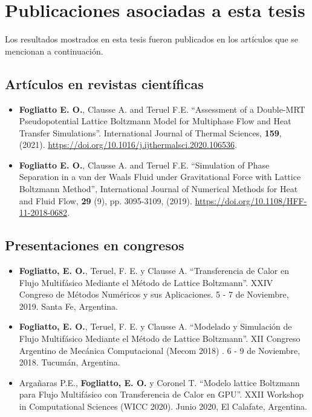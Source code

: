\chapter{Publicaciones asociadas a esta tesis}

Los resultados mostrados en esta tesis fueron publicados en los art\'iculos que se mencionan a continuaci\'on.

\section*{Art\'iculos en revistas cient\'ificas}

\begin{itemize}
\item \textbf{Fogliatto E. O.}, Clausse A. and Teruel F.E. ``Assessment of a Double-MRT Pseudopotential Lattice Boltzmann Model for Multiphase Flow and Heat Transfer Simulations''. International Journal of Thermal Sciences, \textbf{159}, (2021). \url{https://doi.org/10.1016/j.ijthermalsci.2020.106536}.
  
\item \textbf{Fogliatto E. O.}, Clausse A. and Teruel F.E. ``Simulation of Phase Separation in a van der Waals Fluid under Gravitational Force with Lattice Boltzmann Method'', International Journal of Numerical Methods for Heat and Fluid Flow, \textbf{29} (9), pp. 3095-3109, (2019). \url{https://doi.org/10.1108/HFF-11-2018-0682}.
\end{itemize}


\section*{Presentaciones en congresos}

\begin{itemize}
\item \textbf{Fogliatto, E. O.}, Teruel, F. E. y Clausse A. ``Transferencia de Calor en Flujo Multif\'asico Mediante el M\'etodo de Lattice Boltzmann''. XXIV Congreso de M\'etodos Num\'ericos y sus Aplicaciones. 5 - 7 de Noviembre, 2019. Santa Fe, Argentina. 
  
\item \textbf{Fogliatto, E. O.}, Teruel, F. E. y Clausse A. ``Modelado y Simulaci\'on de Flujo Multif\'asico Mediante el M\'etodo de Lattice Boltzmann''. XII Congreso Argentino de Mec\'anica Computacional (Mecom 2018) . 6 - 9 de Noviembre, 2018. Tucum\'an, Argentina. 

\item Argañaras P.E., \textbf{Fogliatto, E. O.} y Coronel T. ``Modelo lattice Boltzmann para Flujo Multif\'asico con Transferencia de Calor en GPU''. XXII Workshop in Computational Sciences (WICC 2020). Junio 2020, El Calafate, Argentina.
\end{itemize}